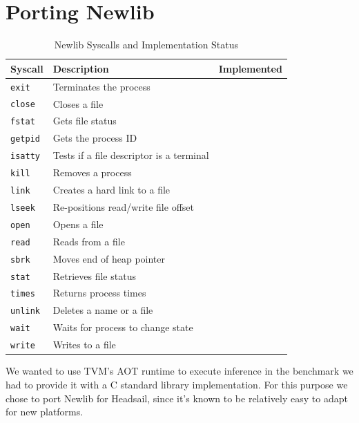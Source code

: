 \documentclass[12pt,a4paper,english
]{tunithesis}
\def\checkmark{\tikz\fill[scale=0.4](0,.35) -- (.25,0) -- (1,.7) -- (.25,.15) -- cycle;}
\def\scalecheck{\resizebox{\widthof{\checkmark}*\ratio{\widthof{x}}{\widthof{\normalsize x}}}{!}{\checkmark}}
\begin{document}
\section{Porting Newlib}
\label{sec:newlib}

\begin{table}[]
\centering
\begin{tabular}{|l|l|c|}
\hline
\textbf{Syscall}       & \textbf{Description}               & \textbf{Implemented} \\ \hline
\texttt{exit}         & Terminates the process             & \scalecheck                       \\ \hline
\texttt{close}         & Closes a file                      &                        \\ \hline
\texttt{fstat}         & Gets file status                   & \scalecheck                       \\ \hline
\texttt{getpid}        & Gets the process ID                &                        \\ \hline
\texttt{isatty}        & Tests if a file descriptor is a terminal & \scalecheck                 \\ \hline
\texttt{kill}          & Removes a process                    &                        \\ \hline
\texttt{link}          & Creates a hard link to a file      &                        \\ \hline
\texttt{lseek}         & Re-positions read/write file offset &                        \\ \hline
\texttt{open}          & Opens a file                       &                        \\ \hline
\texttt{read}          & Reads from a file                  & \scalecheck                       \\ \hline
\texttt{sbrk}          & Moves end of heap pointer          & \scalecheck                       \\ \hline
\texttt{stat}          & Retrieves file status              &                        \\ \hline
\texttt{times}         & Returns process times              &                        \\ \hline
\texttt{unlink}        & Deletes a name or a file           &                        \\ \hline
\texttt{wait}          & Waits for process to change state  &                        \\ \hline
\texttt{write}         & Writes to a file                   & \scalecheck                       \\ \hline
\end{tabular}
\caption{Newlib Syscalls and Implementation Status}
\label{tab:newlib_syscalls}
\end{table}
We wanted to use TVM's AOT runtime to execute inference in the benchmark we had to provide it with a C standard library implementation. For this purpose we chose to port Newlib for Headsail, since it's known to be relatively easy to adapt for new platforms.
\end{document}
